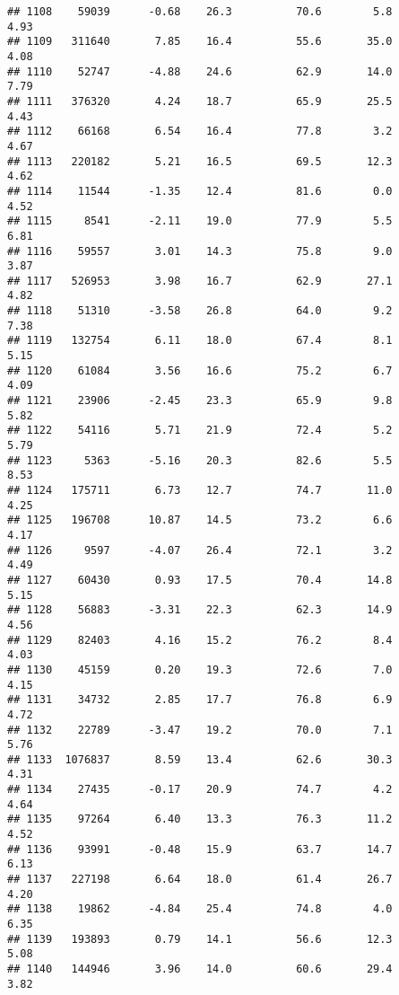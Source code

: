\documentclass[
]{article}
\begin{document}
\begin{verbatim}
## 1108    59039      -0.68    26.3          70.6        5.8              4.93
## 1109   311640       7.85    16.4          55.6       35.0              4.08
## 1110    52747      -4.88    24.6          62.9       14.0              7.79
## 1111   376320       4.24    18.7          65.9       25.5              4.43
## 1112    66168       6.54    16.4          77.8        3.2              4.67
## 1113   220182       5.21    16.5          69.5       12.3              4.62
## 1114    11544      -1.35    12.4          81.6        0.0              4.52
## 1115     8541      -2.11    19.0          77.9        5.5              6.81
## 1116    59557       3.01    14.3          75.8        9.0              3.87
## 1117   526953       3.98    16.7          62.9       27.1              4.82
## 1118    51310      -3.58    26.8          64.0        9.2              7.38
## 1119   132754       6.11    18.0          67.4        8.1              5.15
## 1120    61084       3.56    16.6          75.2        6.7              4.09
## 1121    23906      -2.45    23.3          65.9        9.8              5.82
## 1122    54116       5.71    21.9          72.4        5.2              5.79
## 1123     5363      -5.16    20.3          82.6        5.5              8.53
## 1124   175711       6.73    12.7          74.7       11.0              4.25
## 1125   196708      10.87    14.5          73.2        6.6              4.17
## 1126     9597      -4.07    26.4          72.1        3.2              4.49
## 1127    60430       0.93    17.5          70.4       14.8              5.15
## 1128    56883      -3.31    22.3          62.3       14.9              4.56
## 1129    82403       4.16    15.2          76.2        8.4              4.03
## 1130    45159       0.20    19.3          72.6        7.0              4.15
## 1131    34732       2.85    17.7          76.8        6.9              4.72
## 1132    22789      -3.47    19.2          70.0        7.1              5.76
## 1133  1076837       8.59    13.4          62.6       30.3              4.31
## 1134    27435      -0.17    20.9          74.7        4.2              4.64
## 1135    97264       6.40    13.3          76.3       11.2              4.52
## 1136    93991      -0.48    15.9          63.7       14.7              6.13
## 1137   227198       6.64    18.0          61.4       26.7              4.20
## 1138    19862      -4.84    25.4          74.8        4.0              6.35
## 1139   193893       0.79    14.1          56.6       12.3              5.08
## 1140   144946       3.96    14.0          60.6       29.4              3.82

\end{verbatim}
\end{document}
